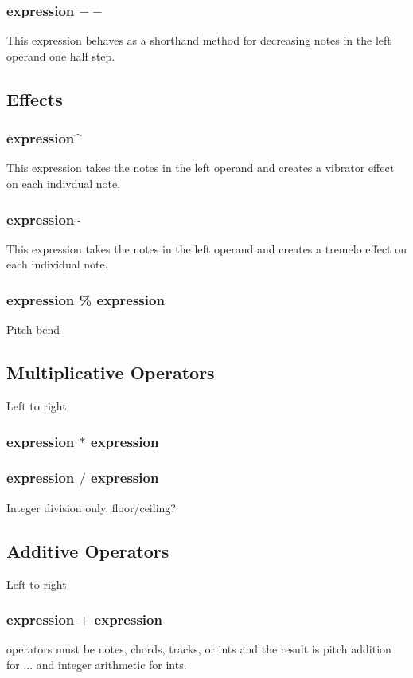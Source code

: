 \documentclass[letterpaper]{article}
\begin{document}
\subsubsection{expression $--$}
This expression behaves as a shorthand method for decreasing notes in the left operand one half step. 
\subsection{Effects}
\subsubsection{expression\textasciicircum}
This expression takes the notes in the left operand and creates a vibrator effect on each indivdual note. 
\subsubsection{expression\textasciitilde}
This expression takes the notes in the left operand and creates a tremelo effect on each individual note.
\subsubsection{expression \% expression}
Pitch bend


\subsection{Multiplicative Operators}
Left to right
\subsubsection{expression $*$ expression}
\subsubsection{expression $/$ expression}
Integer division only. floor/ceiling?

\subsection{Additive Operators}
Left to right
\subsubsection{expression $+$ expression}
operators must be notes, chords, tracks, or ints and the result is pitch addition for ... and integer arithmetic for ints.
\end{document}
